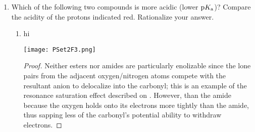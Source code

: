 \documentclass[../psets.tex]{subfiles}
\begin{document}
\begin{enumerate}
\begin{enumerate}
\begin{proof}
            Once acetic acid adds in, its proton will be highly acidic and easily deprotonated by a base in solution. This could be the solvent, but it could also be , , or . Among these choices, I feel like  would do the deprotonation the most often because even though there's not much of it present, there will still be more of it than  (and it's more basic than ) and for , $\pKa=-6.1$. This deprotonation yields the final product.
        \end{proof}
        \item Suggest how the minor products could be formed and draw the key intermediate(s) involved.
        \begin{proof}
            {\color{white}hi}
            \begin{center}
                \texttt{[image: PSet2Q2b.png]}
            \end{center}
            I suggest that the final cation before  adds in has partial nonclassical, 3c-2e character. It will still favor the homoconjugation-stabilized form drawn in part (a) --- accounting for why that gives the major product --- but a Mulliken partial charge on the other carbons could also lead to  addition to those resonance forms followed by deprotonation, as drawn in part (a).
        \end{proof}
    \end{enumerate}
    \pagebreak
    \item Which of the following two compounds is more acidic (lower $\textup{p}K_\textup{a}$)? Compare the acidity of the protons indicated red. Rationalize your answer.
    \begin{enumerate}
        \item {\color{white}hi}
        \begin{center}
            \texttt{[image: PSet2F3.png]}
        \end{center}
        \begin{proof}
            Neither esters nor amides are particularly enolizable since the lone pairs from the adjacent oxygen/nitrogen atoms compete with the resultant anion to delocalize into the carbonyl; this is an example of the resonance saturation effect described on \textcite[282]{bib:Anslyn}. However,  than the amide because the oxygen holds onto its electrons more tightly than the amide, thus sapping less of the carbonyl's potential ability to withdraw electrons.

\end{proof}
\end{enumerate}
\end{enumerate}
\end{document}
